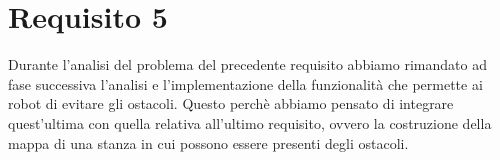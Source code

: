 \documentclass{llncs}
\begin{document}
\pagebreak
\section{Requisito 5}
\label{Requisito5}
Durante l'analisi del problema del precedente requisito abbiamo rimandato ad fase successiva l'analisi e l'implementazione della funzionalit\`a che permette ai robot di evitare gli ostacoli. Questo perch\`e abbiamo pensato di integrare quest'ultima con quella relativa all'ultimo requisito, ovvero la costruzione della mappa di una stanza in cui possono essere presenti degli ostacoli.\\

\end{document}
